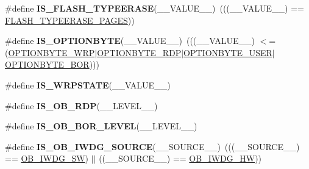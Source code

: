 \begin{DoxyCompactItemize}
\item 
\hypertarget{group___f_l_a_s_h_ex___private___macros_ga4d40dfc92b46733adbabaae5f3db59ab}{\#define {\bfseries I\-S\-\_\-\-F\-L\-A\-S\-H\-\_\-\-T\-Y\-P\-E\-E\-R\-A\-S\-E}(\-\_\-\-\_\-\-V\-A\-L\-U\-E\-\_\-\-\_\-)~(((\-\_\-\-\_\-\-V\-A\-L\-U\-E\-\_\-\-\_\-) == \hyperlink{group___f_l_a_s_h_ex___type___erase_ga3664ce55155ec4990873c51737d787ce}{F\-L\-A\-S\-H\-\_\-\-T\-Y\-P\-E\-E\-R\-A\-S\-E\-\_\-\-P\-A\-G\-E\-S}))}\label{group___f_l_a_s_h_ex___private___macros_ga4d40dfc92b46733adbabaae5f3db59ab}

\item 
\hypertarget{group___f_l_a_s_h_ex___private___macros_gaaced64683b0f15981a06f3d7581387a4}{\#define {\bfseries I\-S\-\_\-\-O\-P\-T\-I\-O\-N\-B\-Y\-T\-E}(\-\_\-\-\_\-\-V\-A\-L\-U\-E\-\_\-\-\_\-)~(((\-\_\-\-\_\-\-V\-A\-L\-U\-E\-\_\-\-\_\-) $<$= (\hyperlink{group___f_l_a_s_h_ex___option___type_ga48712a166ea192ddcda0f2653679f9ec}{O\-P\-T\-I\-O\-N\-B\-Y\-T\-E\-\_\-\-W\-R\-P}$\vert$\hyperlink{group___f_l_a_s_h_ex___option___type_ga8f0bdb21ef13bae39d5d8b6619e2df06}{O\-P\-T\-I\-O\-N\-B\-Y\-T\-E\-\_\-\-R\-D\-P}$\vert$\hyperlink{group___f_l_a_s_h_ex___option___type_gac7d843e666e15c79688a1914e8ffe7a5}{O\-P\-T\-I\-O\-N\-B\-Y\-T\-E\-\_\-\-U\-S\-E\-R}$\vert$\hyperlink{group___f_l_a_s_h_ex___option___type_gaf4063216c8386467d187663190936c07}{O\-P\-T\-I\-O\-N\-B\-Y\-T\-E\-\_\-\-B\-O\-R})))}\label{group___f_l_a_s_h_ex___private___macros_gaaced64683b0f15981a06f3d7581387a4}

\item 
\#define {\bfseries I\-S\-\_\-\-W\-R\-P\-S\-T\-A\-T\-E}(\-\_\-\-\_\-\-V\-A\-L\-U\-E\-\_\-\-\_\-)
\item 
\#define {\bfseries I\-S\-\_\-\-O\-B\-\_\-\-R\-D\-P}(\-\_\-\-\_\-\-L\-E\-V\-E\-L\-\_\-\-\_\-)
\item 
\#define {\bfseries I\-S\-\_\-\-O\-B\-\_\-\-B\-O\-R\-\_\-\-L\-E\-V\-E\-L}(\-\_\-\-\_\-\-L\-E\-V\-E\-L\-\_\-\-\_\-)
\item 
\hypertarget{group___f_l_a_s_h_ex___private___macros_gac7984eb8f1c2943abad77f6cc6db1171}{\#define {\bfseries I\-S\-\_\-\-O\-B\-\_\-\-I\-W\-D\-G\-\_\-\-S\-O\-U\-R\-C\-E}(\-\_\-\-\_\-\-S\-O\-U\-R\-C\-E\-\_\-\-\_\-)~(((\-\_\-\-\_\-\-S\-O\-U\-R\-C\-E\-\_\-\-\_\-) == \hyperlink{group___f_l_a_s_h_ex___option___bytes___i_watchdog_ga5a357e232c955444c3f2ccb9a937ffce}{O\-B\-\_\-\-I\-W\-D\-G\-\_\-\-S\-W}) $\vert$$\vert$ ((\-\_\-\-\_\-\-S\-O\-U\-R\-C\-E\-\_\-\-\_\-) == \hyperlink{group___f_l_a_s_h_ex___option___bytes___i_watchdog_gadfcbfa963d79c339ec8e2d5a7734e47a}{O\-B\-\_\-\-I\-W\-D\-G\-\_\-\-H\-W}))}\label{group___f_l_a_s_h_ex___private___macros_gac7984eb8f1c2943abad77f6cc6db1171}


\end{DoxyCompactItemize}
